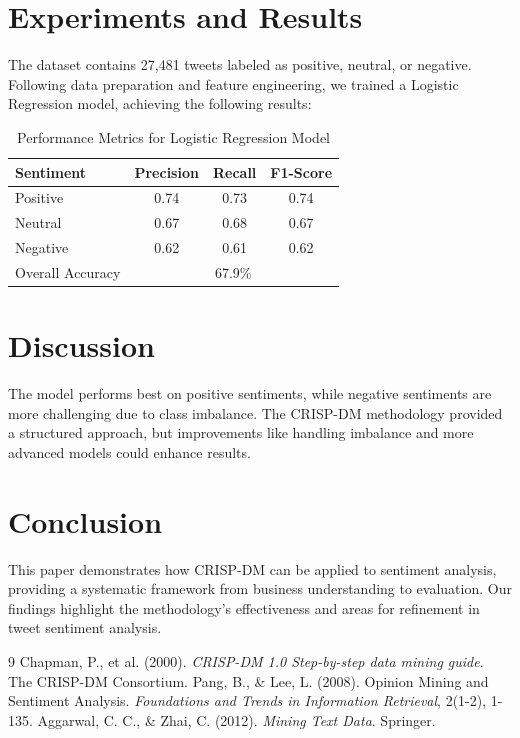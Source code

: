 \documentclass{article}
\begin{document}
\section{Experiments and Results}
The dataset contains 27,481 tweets labeled as positive, neutral, or negative. Following data preparation and feature engineering, we trained a Logistic Regression model, achieving the following results:
\begin{table}[h]
    \centering
    \begin{tabular}{lccc}
        \hline
        Sentiment & Precision & Recall & F1-Score \\
        \hline
        Positive & 0.74 & 0.73 & 0.74 \\
        Neutral & 0.67 & 0.68 & 0.67 \\
        Negative & 0.62 & 0.61 & 0.62 \\
        \hline
        Overall Accuracy & \multicolumn{3}{c}{67.9\%} \\
        \hline
    \end{tabular}
    \caption{Performance Metrics for Logistic Regression Model}
\end{table}

\section{Discussion}
The model performs best on positive sentiments, while negative sentiments are more challenging due to class imbalance. The CRISP-DM methodology provided a structured approach, but improvements like handling imbalance and more advanced models could enhance results.

\section{Conclusion}
This paper demonstrates how CRISP-DM can be applied to sentiment analysis, providing a systematic framework from business understanding to evaluation. Our findings highlight the methodology’s effectiveness and areas for refinement in tweet sentiment analysis.

\begin{thebibliography}{9}
Chapman, P., et al. (2000). \textit{CRISP-DM 1.0 Step-by-step data mining guide}. The CRISP-DM Consortium.
Pang, B., \& Lee, L. (2008). Opinion Mining and Sentiment Analysis. \textit{Foundations and Trends in Information Retrieval}, 2(1-2), 1-135.
Aggarwal, C. C., \& Zhai, C. (2012). \textit{Mining Text Data}. Springer.
\end{thebibliography}
\end{document}
